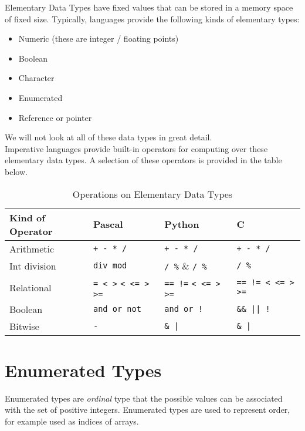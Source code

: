 
Elementary Data Types have fixed values that can be stored in a memory space of fixed size. Typically, languages provide the following kinds of elementary types:
\begin{itemize}
    \item Numeric (these are integer / floating points)
    \item Boolean
    \item Character
    \item Enumerated
    \item Reference or pointer
\end{itemize}
We will not look at all of these data types in great detail. \\

Imperative languages provide built-in operators for computing over these elementary data types. A selection of these operators is provided in the table below.

\begin{table}[H]
    \centering
    {\RaggedRight
    \begin{tabular}{p{} p{} p{} p{}}
    \textbf{Kind of Operator} & \textbf{Pascal} & \textbf{Python} & \textbf{C}\\
    \hline
    \hline
    Arithmetic & \verb|+ - * /| & \verb|+ - * /| & \verb|+ - * /|\\
    \hline
    Int division & \verb|div mod| & \verb|/ %| & \verb|/ %|\\
    \hline
    Relational & \verb|= < >| \verb|< <= > >=| & \verb|== !=| \verb|< <= > >=| & \verb|== != < <= > >=|\\
    \hline
    Boolean & \verb|and or not| & \verb|and or !| & \verb+&& || !+\\
    \hline
    Bitwise & \verb|-| & \verb+& |+ & \verb+& |+\\
    \hline
    \end{tabular}
    } %
    \caption{Operations on Elementary Data Types}
\end{table}

\section{Enumerated Types}
Enumerated types are \textit{ordinal} type that the possible values can be associated with the set of positive integers. Enumerated types are used to represent order, for example used as indices of arrays.\\

